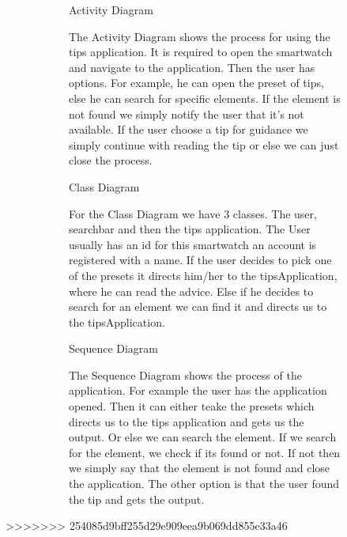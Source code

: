 \documentclass{article}
\begin{document}
	\begin{figure}[htbp]
		\centering
		\begin{subfigure}{\textwidth}
			\resizebox{\textwidth}{!}{}
			\caption{Activity Diagram}
		\end{subfigure}
		\begin{subfigure}{\textwidth}
			The Activity Diagram shows the process for using the tips application. It is required to open the smartwatch and 
			navigate to the application. Then the user has options. For example, he can open the preset of tips, else he can search
			for specific elements. If the element is not found we simply notify the user that it's not available. 
			If the user choose a tip for guidance we simply continue with reading the tip or else we can just close the process. 
		\end{subfigure}
	\end{figure}
	

	\begin{figure}[htbp]
		\centering
		\begin{subfigure}{\textwidth}
			\resizebox{\textwidth}{!}{}
			\caption{Class Diagram}
		\end{subfigure}
		\begin{subfigure}{\textwidth}
			For the Class Diagram we have 3 classes. The user, searchbar and then the tips application. The User usually 
			has an id for this smartwatch an account is registered with a name. If the user decides to pick one of the presets
			it directs him/her to the tipsApplication, where he can read the advice. Else if he decides to search for an element 
			we can find it and directs us to the tipsApplication. 
		\end{subfigure}
	\end{figure}


	\begin{figure}[htbp]
		\centering
		\begin{subfigure}{\textwidth}
			\resizebox{\textwidth}{!}{}
			\caption{Sequence Diagram}
		\end{subfigure}
		\begin{subfigure}{\textwidth}
			The Sequence Diagram shows the process of the application. For example the user has the application opened. Then it can
			either teake the presets which directs us to the tips application and gets us the output. Or else we can search the element. 
			If we search for the element, we check if its found or not. If not then we simply say that the element is not found and close the application. 
			The other option is that the user found the tip and gets the output. 
		\end{subfigure}
	\end{figure}
	\newpage

>>>>>>> 254085d9bff255d29e909eea9b069dd855e33a46
\end{document}
